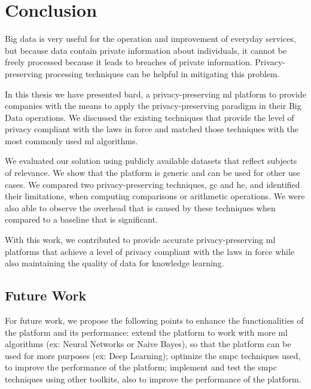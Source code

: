 %

\acresetall

\chapter{Conclusion}
\label{ch:ConclusionsAndFutureWork}


Big data is very useful for the operation and improvement of everyday services, but because data contain private information about individuals, it cannot be freely processed because it leads to breaches of private information. Privacy-preserving processing techniques can be helpful in mitigating this problem.

In this thesis we have presented \acs{bard}, a privacy-preserving \ac{ml} platform to provide companies with the means to apply the privacy-preserving paradigm in their Big Data operations. We discussed the existing techniques that provide the level of privacy compliant with the laws in force and matched those techniques with the most commonly used \ac{ml} algorithms.

We evaluated our solution using publicly available datasets that reflect subjects of relevance. We show that the platform is generic and can be used for other use cases. We compared two privacy-preserving techniques, \ac{gc} and \ac{he}, and identified their limitations, when computing comparisons or arithmetic operations. We were also able to observe the overhead that is caused by these techniques when compared to a baseline that is significant.

With this work, we contributed to provide accurate privacy-preserving \ac{ml} platforms that achieve a level of privacy compliant with the laws in force while also maintaining the quality of data for knowledge learning.



\section{Future Work}
\label{sec:FutureWork}


For future work, we propose the following 
points to enhance the functionalities of the platform and its performance: 
extend the platform to work with more \ac{ml} algorithms (ex: Neural Networks or Naive Bayes), so that the platform can be used for more purposes (ex: Deep Learning); 
optimize the \ac{smpc} techniques used, to improve the performance of the platform; 
implement and test the \ac{smpc} techniques using other toolkits, also to improve the performance of the platform.


